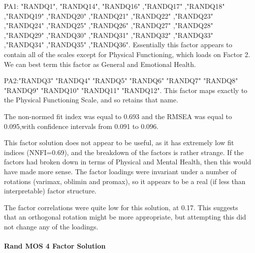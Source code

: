 \documentclass{article}
\begin{document}
PA1: "RANDQ1",  "RANDQ14", "RANDQ16" ,"RANDQ17" ,"RANDQ18" ,"RANDQ19" ,"RANDQ20" ,"RANDQ21" ,"RANDQ22" ,"RANDQ23" ,"RANDQ24" ,"RANDQ25" ,"RANDQ26" ,"RANDQ27"
,"RANDQ28" ,"RANDQ29" ,"RANDQ30" ,"RANDQ31" ,"RANDQ32" ,"RANDQ33" ,"RANDQ34"
,"RANDQ35" ,"RANDQ36". Essentially this factor appears to contain all of the scales except for Physical Functioning, which loads on Factor 2. We can best term this factor as General and Emotional Health.

PA2:"RANDQ3"  "RANDQ4"  "RANDQ5"  "RANDQ6"  "RANDQ7"  "RANDQ8"  "RANDQ9"  "RANDQ10" "RANDQ11" "RANDQ12". This factor maps exactly to the Physical Functioning Scale, and so retains that name.



The non-normed fit index was equal to 0.693
and the RMSEA was equal to 0.095,with confidence intervals from 0.091 to 0.096.

This factor solution does not appear to be useful, as it has extremely low fit indices (NNFI=0.69), and the breakdown of the factors is rather strange. If the factors had broken down in terms of Physical and Mental Health, then this would have made more sense. The factor loadings were invariant under a number of rotations (varimax, oblimin and promax), so it appears to be a real (if less than interpretable) factor structure. 


The factor correlations were quite low for this solution, at 0.17. This suggests that an orthogonal rotation might be more appropriate, but attempting this did not change any of the loadings. 



\paragraph{Rand MOS 4 Factor Solution}
\end{document}
